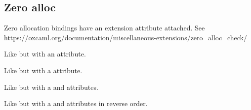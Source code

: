 \subsection{Zero alloc\label{Oxcaml--zero-alloc}}%
\label{Oxcaml--val-add}\begin{ocamlindent}Zero allocation bindings have an extension attribute attached. See https://oxcaml.org/documentation/miscellaneous-extensions/zero\_alloc\_check/\end{ocamlindent}%
\medbreak
\label{Oxcaml--val-add_opt}\begin{ocamlindent}Like  but with an  attribute.\end{ocamlindent}%
\medbreak
\label{Oxcaml--val-add_strict}\begin{ocamlindent}Like  but with a  attribute.\end{ocamlindent}%
\medbreak
\label{Oxcaml--val-add_strict_opt}\begin{ocamlindent}Like  but with a  and  attributes.\end{ocamlindent}%
\medbreak
\label{Oxcaml--val-add_opt_strict}\begin{ocamlindent}Like  but with a  and  attributes in reverse order.\end{ocamlindent}%
\medbreak
